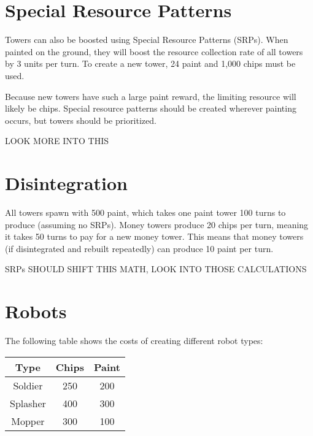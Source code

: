 \documentclass{article}
\begin{document}
  \section*{Special Resource Patterns}

  Towers can also be boosted using Special Resource Patterns (SRPs). When painted on the ground, they will boost the resource collection rate of all towers by 3 units per turn. To create a new tower, 24 paint and 1,000 chips must be used. 

  \medskip

  Because new towers have such a large paint reward, the limiting resource will likely be chips. Special resource patterns should be created wherever painting occurs, but towers should be prioritized.

  \begin{center}
    LOOK MORE INTO THIS
  \end{center}

  \section*{Disintegration}

  All towers spawn with 500 paint, which takes one paint tower 100 turns to produce (assuming no SRPs). Money towers produce 20 chips per turn, meaning it takes 50 turns to pay for a new money tower. This means that money towers (if disintegrated and rebuilt repeatedly) can produce 10 paint per turn.

  \begin{center}
    SRPs SHOULD SHIFT THIS MATH, LOOK INTO THOSE CALCULATIONS
  \end{center}

  \section*{Robots}

  The following table shows the costs of creating different robot types:

  \begin{center}
    \begin{tabular}{c | c | c}
      Type & Chips & Paint \\
      \hline
      Soldier & 250 & 200 \\
      Splasher & 400 & 300 \\
      Mopper & 300 & 100
    \end{tabular}
  \end{center}
\end{document}

